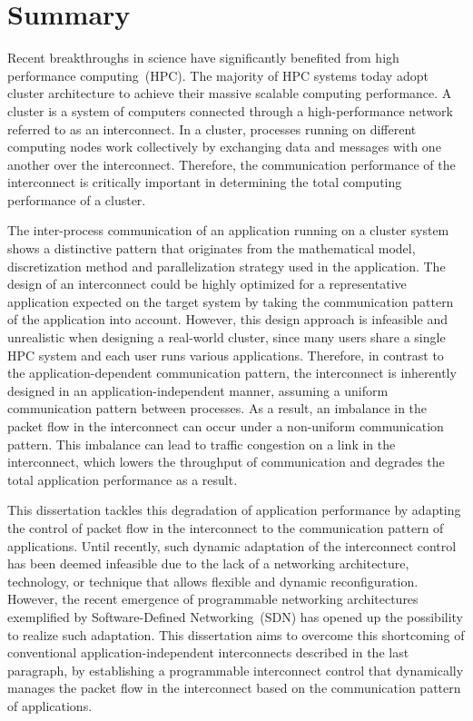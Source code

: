 \pagestyle{myheadings}
\markright{}
\chapter*{Summary}

Recent breakthroughs in science have significantly benefited from high
performance computing~(HPC). The majority of HPC systems today adopt cluster
architecture to achieve their massive scalable computing performance. A
cluster is a system of computers connected through a high-performance network
referred to as an interconnect. In a cluster, processes running on different
computing nodes work collectively by exchanging data and messages with one
another over the interconnect. Therefore, the communication performance of the
interconnect is critically important in determining the total computing
performance of a cluster.

The inter-process communication of an application running on a cluster system
shows a distinctive pattern that originates from the mathematical model,
discretization method and parallelization strategy used in the application.
The design of an interconnect could be highly optimized for a representative
application expected on the target system by taking the communication pattern
of the application into account. However, this design approach is infeasible
and unrealistic when designing a real-world cluster, since many users share a
single HPC system and each user runs various applications. Therefore, in
contrast to the application-dependent communication pattern, the interconnect
is inherently designed in an application-independent manner, assuming a
uniform communication pattern between processes. As a result, an imbalance in
the packet flow in the interconnect can occur under a non-uniform
communication pattern. This imbalance can lead to traffic congestion on a link
in the interconnect, which lowers the throughput of communication and degrades
the total application performance as a result.

This dissertation tackles this degradation of application performance by
adapting the control of packet flow in the interconnect to the communication
pattern of applications. Until recently, such dynamic adaptation of the
interconnect control has been deemed infeasible due to the lack of a
networking architecture, technology, or technique that allows flexible and
dynamic reconfiguration. However, the recent emergence of programmable
networking architectures exemplified by Software-Defined Networking~(SDN) has
opened up the possibility to realize such adaptation. This dissertation aims
to overcome this shortcoming of conventional application-independent
interconnects described in the last paragraph, by establishing a programmable
interconnect control that dynamically manages the packet flow in the
interconnect based on the communication pattern of applications.

